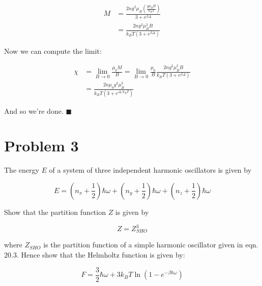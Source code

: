 \documentclass[10pt]{article}
\begin{document}
\begin{solution}
        \begin{align*}
            M &= \frac{2n g^2 \mu_B \left(\frac{g\mu_BB}{k_BT}\right)}{ 3 + e^{\beta \Delta}}\\
            &= \frac{2ng^2\mu_B^2 B}{k_BT(3 + e^{\beta \Delta})}
        \end{align*}

        Now we can compute the limit:

        \begin{align*}
            \chi &= \lim_{B \to 0} \frac{\mu_0 M}{B} = \lim_{B \to 0}\frac{\mu_0}{B} \frac{2ng^2\mu_B^2 B}{k_BT(3 + e^{\beta \Delta})}\\
            &= \frac{2 n \mu_0 g^2 \mu_B^2}{k_BT (3 + e^{\Delta/k_BT})}
        \end{align*}

        And so we're done. $\blacksquare$





    \end{solution}

    \pagebreak
    \section*{Problem 3}

    The energy $E$ of a system of three independent harmonic oscillators is given by 

    \[ E = \left(n_x + \frac{1}{2}\right) \hbar \omega + \left(n_y + \frac{1}{2}\right) \hbar \omega + \left(n_z + \frac{1}{2}\right) \hbar \omega\] 

    Show that the partition function $Z$ is given by 

    \[ Z = Z_{SHO}^3\]
    
    where $Z_{SHO}$ is the partition function of a simple harmonic oscillator given in eqn. 20.3. Hence show that the Helmholtz function is given by:

    \[ F = \frac{3}{2} \hbar \omega + 3k_BT\ln (1 - e^{-\beta \hbar \omega})\] 
\end{document}
